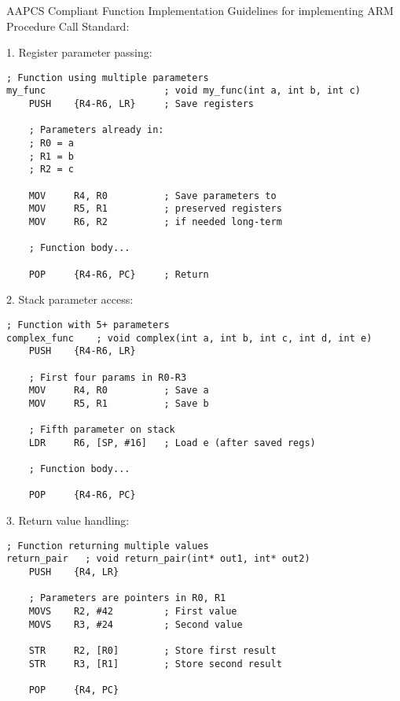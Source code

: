 \begin{KR}{AAPCS Compliant Function Implementation}
Guidelines for implementing ARM Procedure Call Standard:

1. Register parameter passing:
\begin{lstlisting}[language=armasm, style=basesmol]
; Function using multiple parameters
my_func                     ; void my_func(int a, int b, int c)
    PUSH    {R4-R6, LR}     ; Save registers
    
    ; Parameters already in:
    ; R0 = a
    ; R1 = b
    ; R2 = c
    
    MOV     R4, R0          ; Save parameters to
    MOV     R5, R1          ; preserved registers
    MOV     R6, R2          ; if needed long-term
    
    ; Function body...
    
    POP     {R4-R6, PC}     ; Return
\end{lstlisting}

2. Stack parameter access:
\begin{lstlisting}[language=armasm, style=basesmol]
; Function with 5+ parameters
complex_func    ; void complex(int a, int b, int c, int d, int e)
    PUSH    {R4-R6, LR}
    
    ; First four params in R0-R3
    MOV     R4, R0          ; Save a
    MOV     R5, R1          ; Save b
    
    ; Fifth parameter on stack
    LDR     R6, [SP, #16]   ; Load e (after saved regs)
    
    ; Function body...
    
    POP     {R4-R6, PC}
\end{lstlisting}

3. Return value handling:
\begin{lstlisting}[language=armasm, style=basesmol]
; Function returning multiple values
return_pair   ; void return_pair(int* out1, int* out2)
    PUSH    {R4, LR}
    
    ; Parameters are pointers in R0, R1
    MOVS    R2, #42         ; First value
    MOVS    R3, #24         ; Second value
    
    STR     R2, [R0]        ; Store first result
    STR     R3, [R1]        ; Store second result
    
    POP     {R4, PC}
\end{lstlisting}
\end{KR}

